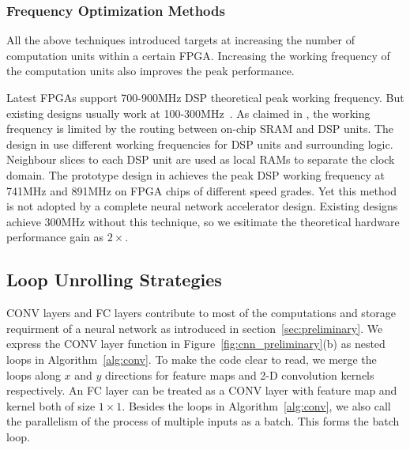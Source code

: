
\subsubsection{Frequency Optimization Methods}
All the above techniques introduced targets at increasing the number of computation units within a certain FPGA. Increasing the working frequency of the computation units also improves the peak performance.

Latest FPGAs support 700-900MHz DSP theoretical peak working frequency. But existing designs usually work at 100-300MHz~\cite{qiu2016going, guo2017angel, zhang2016caffeine, ma2017optimizing}. As claimed in \cite{wu2017high}, the working frequency is limited by the routing between on-chip SRAM and DSP units. The design in \cite{wu2017high} use different working frequencies for DSP units and surrounding logic. Neighbour slices to each DSP unit are used as local RAMs to separate the clock domain. The prototype design in \cite{wu2017high} achieves the peak DSP working frequency at 741MHz and 891MHz on FPGA chips of different speed grades. Yet this method is not adopted by a complete neural network accelerator design. Existing designs achieve 300MHz without this technique, so we esitimate the theoretical hardware performance gain as $2\times$.

\subsection{Loop Unrolling Strategies}\label{sec:hardware:lu}
CONV layers and FC layers contribute to most of the computations and storage requirment of a neural network as introduced in section~\ref{sec:preliminary}. We express the CONV layer function in Figure~\ref{fig:cnn_preliminary}(b) as nested loops in Algorithm~\ref{alg:conv}. To make the code clear to read, we merge the loops along $x$ and $y$ directions for feature maps and 2-D convolution kernels respectively. An FC layer can be treated as a CONV layer with feature map and kernel both of size $1\times 1$. Besides the loops in Algorithm~\ref{alg:conv}, we also call the parallelism of the process of multiple inputs as a batch. This forms the batch loop.

